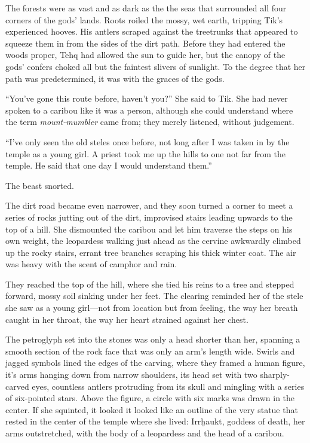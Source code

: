 The forests were as vast and as dark as the the seas that surrounded all four corners of the gods' lands. Roots roiled the mossy, wet earth, tripping Tik's experienced hooves. His antlers scraped against the treetrunks that appeared to squeeze them in from the sides of the dirt path. Before they had entered the woods proper, Tehq had allowed the sun to guide her, but the canopy of the gods' confers choked all but the faintest slivers of sunlight. To the degree that her path was predetermined, it was with the graces of the gods.

``You've gone this route before, haven't you?'' She said to Tik. She had never spoken to a caribou like it was a person, although she could understand where the term \emph{mount-mumbler} came from; they merely listened, without judgement.

``I've only seen the old steles once before, not long after I was taken in by the temple as a young girl. A priest took me up the hills to one not far from the temple. He said that one day I would understand them.''

The beast snorted.

The dirt road became even narrower, and they soon turned a corner to meet a series of rocks jutting out of the dirt, improvised stairs leading upwards to the top of a hill. She dismounted the caribou and let him traverse the steps on his own weight, the leopardess walking just ahead as the cervine awkwardly climbed up the rocky stairs, errant tree branches scraping his thick winter coat. The air was heavy with the scent of camphor and rain.

They reached the top of the hill, where she tied his reins to a tree and stepped forward, mossy soil sinking under her feet. The clearing reminded her of the stele she saw as a young girl---not from location but from feeling, the way her breath caught in her throat, the way her heart strained against her chest.

The petroglyph set into the stones was only a head shorter than her, spanning a smooth section of the rock face that was only an arm's length wide. Swirls and jagged symbols lined the edges of the carving, where they framed a human figure, it's arms hanging down from narrow shoulders, its head set with two sharply-carved eyes, countless antlers protruding from its skull and mingling with a series of six-pointed stars. Above the figure, a circle with six marks was drawn in the center. If she squinted, it looked it looked like an outline of the very statue that rested in the center of the temple where she lived: Irrḫaukt, goddess of death, her arms outstretched, with the body of a leopardess and the head of a caribou.

